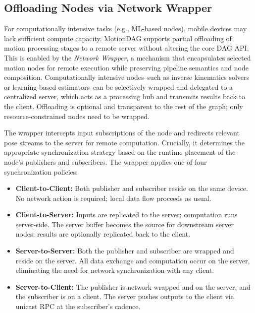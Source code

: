 \subsection{Offloading Nodes via Network Wrapper}\label{subsec:networkoffloading}

For computationally intensive tasks (e.g., ML-based nodes), mobile devices may lack sufficient compute capacity.
MotionDAG supports partial offloading of motion processing stages to a remote server without altering the core DAG API. 
This is enabled by the \textit{Network Wrapper}, a mechanism that encapsulates selected motion nodes for remote execution while preserving pipeline semantics and node composition. Computationally intensive nodes--such as inverse kinematics solvers or learning-based estimators--can be selectively wrapped and delegated to a centralized server, which acts as a processing hub and transmits results back to the client. Offloading is optional and transparent to the rest of the graph; only resource-constrained nodes need to be wrapped.

The wrapper intercepts input subscriptions of the node and redirects relevant pose streams to the server for remote computation. 
Crucially, it determines the appropriate synchronization strategy based on the runtime placement of the node's publishers and subscribers. The wrapper applies one of four synchronization policies:

\begin{itemize}
    \item \textbf{Client-to-Client:}
    Both publisher and subscriber reside on the same device. No network action is required; local data flow proceeds as usual.
    \item \textbf{Client-to-Server:} 
    Inputs are replicated to the server; computation runs server-side. The server buffer becomes the source for downstream server nodes; results are optionally replicated back to the client.
    \item \textbf{Server-to-Server:} 
    Both the publisher and subscriber are wrapped and reside on the server. All data exchange and computation occur on the server, eliminating the need for network synchronization with any client.
    \item \textbf{Server-to-Client:} 
    The publisher is network-wrapped and on the server, and the subscriber is on a client. The server pushes outputs to the client via unicast RPC at the subscriber's cadence.
\end{itemize}

